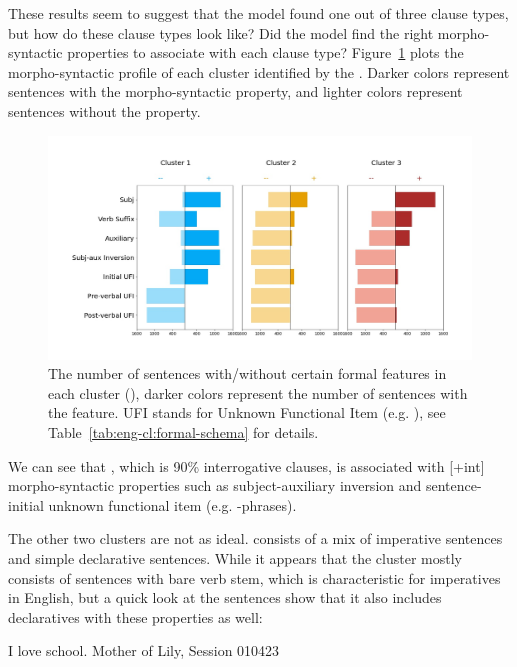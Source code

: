 These results seem to suggest that the \dlearnerabbr{} model found one out of three clause types, but how do these clause types look like? Did the model find the right morpho-syntactic properties to associate with each clause type? Figure~\ref{fig:baseline-syncluster} plots the morpho-syntactic profile of each cluster identified by the \dlearnerabbr{}. Darker colors represent sentences with the morpho-syntactic property, and lighter colors represent sentences without the property. 

\begin{figure}[H]
    \centering
    \includegraphics[width=1\textwidth]{figures/baseline-syncluster.jpg}
    \caption{The number of sentences with/without certain formal features in each cluster (), darker colors represent the number of sentences with the feature. UFI stands for Unknown Functional Item (e.g. \twh{}), see Table~\ref{tab:eng-cl:formal-schema} for details.}
    \label{fig:baseline-syncluster}
\end{figure}

We can see that , which is 90\% interrogative clauses, is associated with [+int] morpho-syntactic properties such as subject-auxiliary inversion and sentence-initial unknown functional item (e.g. \twh-phrases). 

The other two clusters are not as ideal.  consists of a mix of imperative sentences and simple declarative sentences. While it appears that the cluster mostly consists of sentences with bare verb stem, which is characteristic for imperatives in English, but a quick look at the sentences show that it also includes declaratives with these properties as well:

 I love school. \hfill Mother of Lily, Session 010423
\eex

